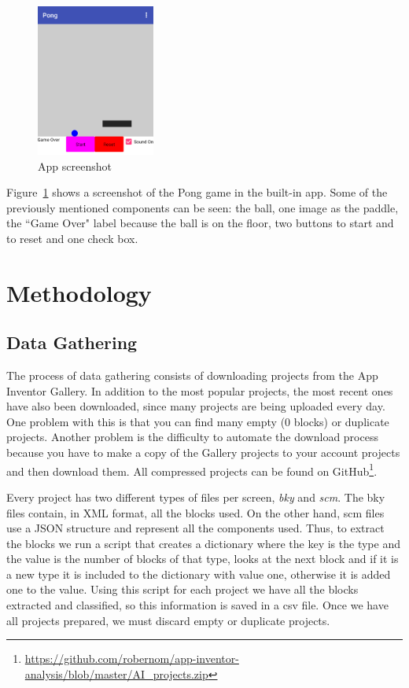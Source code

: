 \documentclass[a4paper]{article}
\begin{document}
\begin{figure}
\begin{center}
\includegraphics[height=5cm]{app-screen}
\caption{App screenshot}
\label{fig:app-example}
\end{center}
\end{figure}

Figure~\ref{fig:app-example} shows a screenshot of the Pong game in the built-in app. Some of the previously mentioned components can be seen: the ball, one image as the paddle, the ``Game Over" label because the ball is on the floor, two buttons to start and to reset and one check box.

\section{Methodology}
\subsection{Data Gathering}
The process of data gathering consists of downloading projects from the App Inventor Gallery. In addition to the most popular projects, the most recent ones have also been downloaded, since many projects are being uploaded every day. One problem with this is that you can find many empty (0 blocks) or duplicate projects. Another problem is the difficulty to automate the download process because you have to make a copy of the Gallery projects to your account projects and then download them. All compressed projects can be found on GitHub\footnote{\url{https://github.com/robernom/app-inventor-analysis/blob/master/AI_projects.zip}}.

Every project has two different types of files per screen, \emph{bky} and \emph{scm}. The bky files contain, in XML format, all the blocks used. On the other hand, scm files use a JSON structure and represent all the components used. Thus, to extract the blocks we run a script that creates a dictionary where the key is the type and the value is the number of blocks of that type, looks at the next block and if it is a new type it is included to the dictionary with value one, otherwise it is added one to the value. Using this script for each project we have all the blocks extracted and classified, so this information is saved in a csv file. Once we have all projects prepared, we must discard empty or duplicate projects. 
\end{document}
